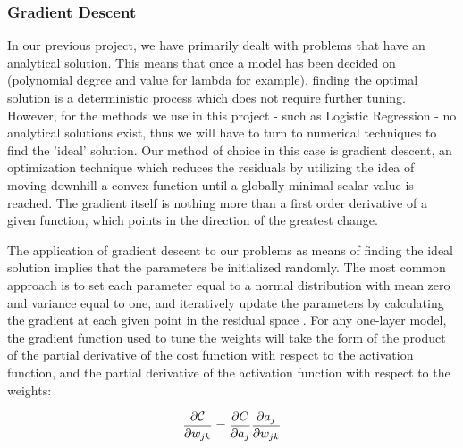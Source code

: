 \documentclass[onecolumn,10pt,cleanfoot]{asme2ej}
\begin{document}
 

\subsubsection{Gradient Descent}

In our previous project, we have primarily dealt with problems that have an analytical solution. This means that once a model has been decided on (polynomial degree and value for lambda for example), finding the optimal solution is a deterministic process which does not require further tuning. However, for the methods we use in this project - such as Logistic Regression - no analytical solutions exist, thus we will have to turn to numerical techniques to find the 'ideal' solution. Our method of choice in this case is gradient descent, an optimization technique which reduces the residuals by utilizing the idea of moving downhill a convex function until a globally minimal scalar value is reached. The gradient itself is nothing more than a first order derivative of a given function, which points in the direction of the greatest change. 

The application of gradient descent to our problems as means of finding the ideal solution implies that the parameters be initialized randomly. The most common approach is to set each parameter equal to a normal distribution with mean zero and variance equal to one, and iteratively update the parameters by calculating the gradient at each given point in the residual space \cite[preface p. x]{dds}. For any one-layer model, the gradient function used to tune the weights will take the form of the product of the partial derivative of the cost function with respect to the activation function, and the partial derivative of the activation function with respect to the weights: 

\begin{equation}
\frac{\partial{\cal C}}{\partial w_{jk}}  = \frac{\partial C}{\partial a_{j}}\frac{\partial a_j}{\partial w_{jk}}
\end{equation}
\end{document}
